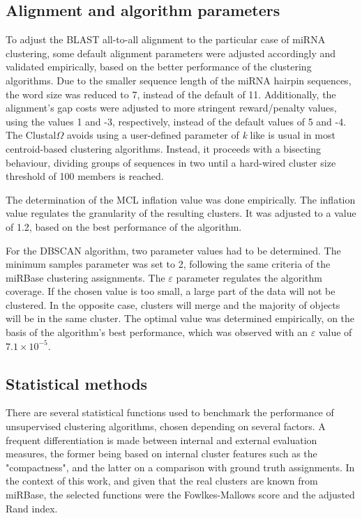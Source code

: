 \documentclass[nocrop]{bioinfo}
\begin{document}
\begin{methods}
\subsection{Alignment and algorithm parameters}
To adjust the BLAST all-to-all alignment to the particular case of miRNA clustering, some default alignment parameters were adjusted accordingly and validated empirically, based on the better performance of the clustering algorithms. Due to the smaller sequence length of the miRNA hairpin sequences, the word size was reduced to 7, instead of the default of 11. Additionally, the alignment's gap costs were adjusted to more stringent reward/penalty values, using the values 1 and -3, respectively, instead of the default values of 5 and -4.
The Clustal$\Omega$ avoids using a user-defined parameter of \textit{k} like is usual in most centroid-based clustering algorithms. Instead, it proceeds with a bisecting behaviour, dividing groups of sequences in two until a hard-wired cluster size threshold of 100 members is reached.

The determination of the MCL inflation value was done empirically. The inflation value regulates the granularity of the resulting clusters. It was adjusted to a value of 1.2, based on the best performance of the algorithm.

For the DBSCAN algorithm, two parameter values had to be determined. The minimum samples parameter was set to 2, following the same criteria of the miRBase clustering assignments. The $\varepsilon$ parameter regulates the algorithm coverage. If the chosen value is too small, a large part of the data will not be clustered. In the opposite case, clusters will merge and the majority of objects will be in the same cluster. The optimal value was determined empirically, on the basis of the algorithm's best performance, which was observed with an $\varepsilon$ value of $7.1 \times 10^{-5}$.

\subsection{Statistical methods}
There are several statistical functions used to benchmark the performance of unsupervised clustering algorithms, chosen depending on several factors. A frequent differentiation is made between internal and external evaluation measures, the former being based on internal cluster features such as the "compactness", and the latter on a comparison with ground truth assignments. In the context of this work, and given that the real clusters are known from miRBase, the selected functions were the Fowlkes-Mallows score and the adjusted Rand index.


\end{methods}
\end{document}
